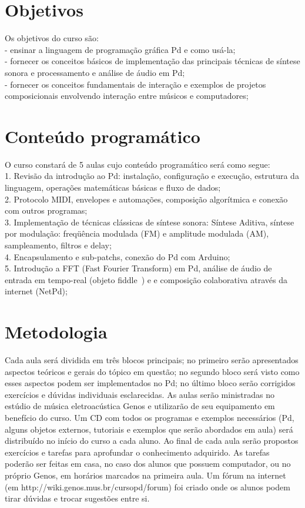 \documentclass{article}
\begin{document}
		
\section {Objetivos}

Os objetivos do curso são:\\
- ensinar a linguagem de programação gráfica Pd e como usá-la;\\
- fornecer os conceitos básicos de implementação das principais técnicas de síntese sonora
e processamento e análise de áudio em Pd;\\
- fornecer os conceitos fundamentais de interação e exemplos de projetos composicionais
envolvendo interação entre músicos e computadores;\\


\section {Conteúdo programático}

O curso constará de 5 aulas cujo conteúdo programático será como segue:\\
1.  Revisão da introdução ao Pd:
instalação, configuração e execução, estrutura da linguagem, operações matemáticas básicas
e fluxo de dados;\\
2. Protocolo MIDI, envelopes e automações, composição algorítmica e conexão com outros programas;\\
3. Implementação de técnicas clássicas de síntese sonora: Síntese Aditiva,
síntese por modulação: freqüência modulada (FM) e amplitude modulada (AM),
sampleamento, filtros e delay;\\
4. Encapsulamento e sub-patchs, conexão do Pd com Arduino;\\
5. Introdução a FFT (Fast Fourier Transform) em Pd, análise de áudio de entrada em
tempo-real (objeto fiddle~) e e composição colaborativa através da internet (NetPd);\\


\section {Metodologia}

       Cada aula será dividida em três blocos principais; no primeiro serão apresentados
aspectos teóricos e gerais do tópico em questão; no segundo bloco será visto como esses
aspectos podem ser implementados no Pd; no último bloco serão corrigidos exercícios e
dúvidas individuais esclarecidas.
       As aulas serão ministradas no estúdio de música eletroacústica Genos e utilizarão de
seu equipamento em benefício do curso. Um CD com todos os programas e exemplos
necessários (Pd, alguns objetos externos, tutoriais e exemplos que serão abordados em aula)
será distribuído no início do curso a cada aluno. Ao final de cada aula serão propostos
exercícios e tarefas para aprofundar o conhecimento adquirido. As tarefas poderão ser feitas
em casa, no caso dos alunos que possuem computador, ou no próprio Genos, em horários
marcados        na      primeira     aula.    Um      fórum       na       internet     (em
http://wiki.genos.mus.br/cursopd/forum) foi criado onde os alunos podem tirar dúvidas e
trocar sugestões entre si.
\end{document}
